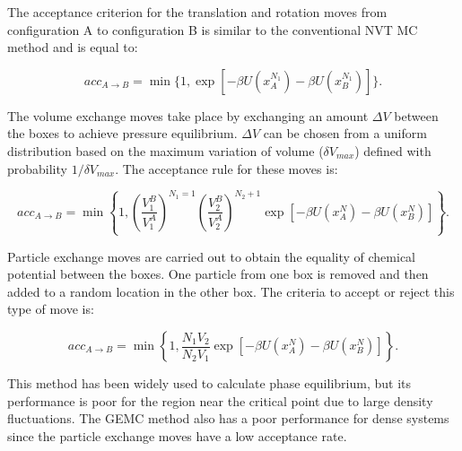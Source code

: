 	The acceptance criterion for the translation and rotation moves from configuration A	to configuration B is similar to the conventional NVT MC method and is equal to:
	
	\begin{equation}
	acc_{A \rightarrow B} = \min \lbrace 1,\exp[-\beta U(x_{A}^{N_{1}}) -\beta U(x_{B}^{N_{1}})] \rbrace .
	\label{eqn:drprob}
	\end{equation} 
	
	The volume exchange moves take place by exchanging an amount $\Delta V$ between the boxes to achieve pressure equilibrium. $\Delta V$ can be chosen from a uniform distribution based on the maximum variation of volume ($\delta V_{max}$) defined with probability $1/\delta V_{max}$. The acceptance rule for these moves is: 
	
	\begin{equation}
	acc_{A \rightarrow B} = \min \left \lbrace 1, \left(\dfrac{V_{1}^{B}}{V_{1}^{A}} \right)^{N_{1}=1} \left( \dfrac{V_{2}^{B}}{V_{2}^{A}} \right)^{N_{2}+1} \exp[-\beta U(x_{A}^{N}) -\beta U(x_{B}^{N})] \right \rbrace .
	\label{vprob}
	\end{equation}
	
	Particle exchange moves are carried out to obtain the equality of chemical potential between the boxes. One particle from one box is removed and then added to a random location in the other box. The criteria to accept or reject this type of move is:
	
	\begin{equation}
	acc_{A \rightarrow B} = \min \left \lbrace 1, \dfrac{N_{1}V_{2}}{N_{2}V_{1}}  \exp[-\beta U(x_{A}^{N}) -\beta U(x_{B}^{N})] \right \rbrace .
	\label{moleprob}
	\end{equation}
	
	This method has been widely used to calculate phase equilibrium, but its performance is poor for the region near the critical point due to large density fluctuations. The GEMC method also has a poor performance for dense systems since the particle exchange moves have a low acceptance rate.  
	
	
	
	
	
